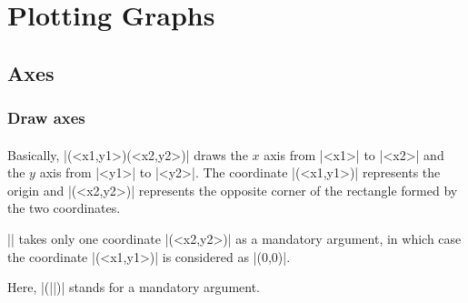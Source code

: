 %

\part{Plotting Graphs}
\label{p:plotting}


\chapter{Axes}
\label{c:axes}

\section{Draw axes}
\label{s:tzaxes}

\subsection{\protect\cmd{\tzaxes}}
\label{ss:tzaxes}

Basically, \cmd{\tzaxes}|(<x1,y1>)(<x2,y2>)| draws the $x$ axis from |<x1>| to |<x2>| and the $y$ axis from |<y1>| to |<y2>|.
The coordinate |(<x1,y1>)| represents the origin and |(<x2,y2>)| represents the opposite corner of the rectangle formed by the two coordinates.

|\tzaxes| takes only one coordinate |(<x2,y2>)| as a mandatory argument, in which case the coordinate |(<x1,y1>)| is considered as |(0,0)|.


Here, |(||)| stands for a mandatory argument.

\begin{tzcode}{.3}
\end{tzcode}

